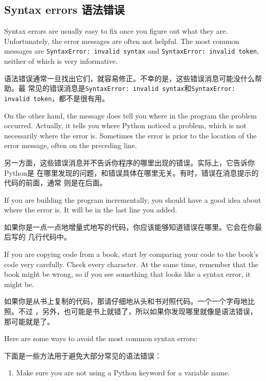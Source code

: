 \documentclass[10pt]{book}
\begin{document}
\begin{CJK}{UTF8}{gbsn}
\section{Syntax errors 语法错误}

Syntax errors are usually easy to fix once you figure out what they
are.  Unfortunately, the error messages are often not helpful.
The most common messages are {\tt SyntaxError: invalid syntax} and
{\tt SyntaxError: invalid token}, neither of which is very informative.

语法错误通常一旦找出它们，就容易修正。不幸的是，这些错误消息可能没什么帮助。最
常见的错误消息是{\tt SyntaxError: invalid syntax}和{\tt SyntaxError: invalid
token}，都不是很有用。

On the other hand, the message does tell you where in the program the
problem occurred.  Actually, it tells you where Python
noticed a problem, which is not necessarily where the error
is.  Sometimes the error is prior to the location of the error
message, often on the preceding line.

另一方面，这些错误消息并不告诉你程序的哪里出现的错误。实际上，它告诉你Python是
在哪里发现的问题，和错误具体在哪里无关。有时，错误在消息提示的代码的前面，通常
则是在后面。

If you are building the program incrementally, you should have
a good idea about where the error is.  It will be in the last
line you added.

如果你是一点一点地增量式地写的代码，你应该能够知道错误在哪里。它会在你最后写的
几行代码中。

If you are copying code from a book, start by comparing
your code to the book's code very carefully.  Check every character.
At the same time, remember that the book might be wrong, so
if you see something that looks like a syntax error, it might be.

如果你是从书上复制的代码，那请仔细地从头和书对照代码。一个一个字母地比照。不过
，另外，也可能是书上就错了，所以如果你发现哪里就像是语法错误，那可能就是了。

Here are some ways to avoid the most common syntax errors:

下面是一些方法用于避免大部分常见的语法错误：

\begin{enumerate}

\item Make sure you are not using a Python keyword for a variable name.


\end{enumerate}
\end{CJK}
\end{document}
